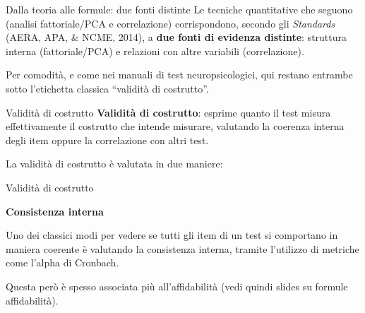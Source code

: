 \documentclass[
  ignorenonframetext,
]{beamer}
\begin{document}
\begin{frame}{Dalla teoria alle formule: due fonti distinte}
\label{dalla-teoria-alle-formule-due-fonti-distinte}
Le tecniche quantitative che seguono (analisi fattoriale/PCA e
correlazione) corrispondono, secondo gli \emph{Standards} (AERA, APA, \&
NCME, 2014), a \textbf{due fonti di evidenza distinte}: struttura
interna (fattoriale/PCA) e relazioni con altre variabili (correlazione).

Per comodità, e come nei manuali di test neuropsicologici, qui restano
entrambe sotto l'etichetta classica ``validità di costrutto''.
\end{frame}

\begin{frame}{Validità di costrutto}
\label{validituxe0-di-costrutto}
\textbf{Validità di costrutto}: esprime quanto il test misura
effettivamente il costrutto che intende misurare, valutando la coerenza
interna degli item oppure la correlazione con altri test.

La validità di costrutto è valutata in due maniere:

\end{frame}

\begin{frame}{Validità di costrutto}
\label{validituxe0-di-costrutto-1}
\begin{center}
  \textbf{Consistenza interna}
\end{center}
\vspace{2em}

Uno dei classici modi per vedere se tutti gli item di un test si
comportano in maniera coerente è valutando la consistenza interna,
tramite l'utilizzo di metriche come l'alpha di Cronbach.

Questa però è spesso associata più all'affidabilità (vedi quindi slides
su formule affidabilità).
\end{frame}
\end{document}
